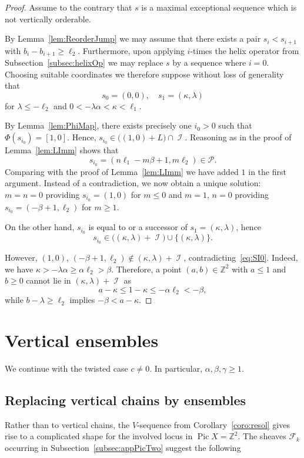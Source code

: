 \documentclass[11pt]{article}
\theoremstyle{definition}
\numberwithin{equation}{section}
\newcommand{\cP}{\mathcal{P}}
\newcommand{\Z}{\mathbb Z}
\newcommand{\CF}{{\mathcal F}}
\newcommand{\CI}{{\mathcal I}}
\newcommand{\Pic}{\operatorname{Pic}}
\newcommand{\nImm}{\operatorname{\CI}}
\newcommand{\xa}{\alpha}
\newcommand{\xb}{\beta}
\newcommand{\xc}{{\gamma}}
\newcommand{\cl}{s}
\newcommand{\kV}{V}
\newcommand{\wbox}{ensemble}
\newcommand{\ssect}[1]{Subsection~\ref{#1}}
\begin{document}
\begin{proof}
Assume to the contrary that $\cl$ is a maximal 
exceptional sequence which is not vertically 
orderable. 

By Lemma~\ref{lem:ReorderJump} we may assume 
that there exists a pair $\cl_i<\cl_{i+1}$
with $b_i-b_{i+1}\geq\ell_2$. Furthermore, upon
applying $i$-times the helix operator from 
\ssect{subsec:helixOp} we may replace $\cl$
by a sequence where $i=0$. Choosing suitable
coordinates we therefore suppose
without loss of generality that
$$
\cl_0=(0,0),\quad\cl_1=(\kappa,\lambda)
$$
for $\lambda\leq-\ell_2$ and 
$0<-\lambda\xa<\kappa<\ell_1$. 

By Lemma~\ref{lem:PhiMap}, there exists precisely 
one $i_0>0$ such that $\Phi(\cl_{i_0})=[1,0]$. 
Hence, $\cl_{i_0}\in\big((1,0)+L\big)\cap\nImm$. 
Reasoning as in the proof of Lemma~\ref{lem:LImm} 
{shows that} 
$$
\cl_{i_0}=(n\ell_1-m\xb+1,m\ell_2)\in\cP. 
$$
{Comparing with the proof of
Lemma~\ref{lem:LImm} we have added $1$ in the first argument. 
Instead of a contradiction, we now obtain a unique solution:
$m=n=0$ providing $\cl_{i_0}=(1,0)$ for $m\leq0$ and 
$m=1$, $n=0$ providing $\cl_{i_0}=(-\xb+1,\ell_2)$ for $m\geq1$.}

On the other hand, $\cl_{i_0}$ is equal to or 
a successor of $\cl_1=(\kappa,\lambda)$, hence
\begin{equation}\label{eq:SI0}
\cl_{i_0}\in\big((\kappa,\lambda)+\nImm\big)
\cup\{(\kappa,\lambda)\}.
\end{equation}

However, $(1,0)$, 
$(-\xb+1,\ell_2)\not\in(\kappa,\lambda)+\nImm$, 
contradicting~\eqref{eq:SI0}. Indeed, we have 
$\kappa>-\lambda\xa\geq\xa\ell_2>\xb$.
Therefore, a point 
$(a,b)\in\Z^2$ with $a\leq1$ and $b\geq0$ cannot 
lie in $(\kappa,\lambda)+\nImm$ as
$$
a-\kappa\leq1-\kappa\leq-\xa\ell_2<-\xb,
$$
while $b-\lambda\geq\ell_2$ implies 
$-\xb<a-\kappa$. 
\end{proof}

\section{Vertical {\wbox}s}
\label{sec:HCVB}
{We continue with the twisted case $c\neq 0$.
In particular, $\xa,\xb,\xc\geq 1$.}
\subsection{Replacing vertical chains by 
ensembles}
\label{subsec:vertBoxes}
Rather than to vertical chains, the $\kV$-sequence 
from Corollary~\ref{coro:resol} gives rise to 
a complicated shape for the involved locus 
in $\Pic X=\Z^2$. The sheaves
$\CF_k$ occurring in \ssect{subsec:appPicTwo}
suggest the following  
\end{document}
